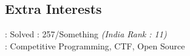 \documentclass[mm]{simple_style}
\begin{document}
\begin{resume}
\sectionline

\section{Extra Interests}
: Solved : 257/Something \textit{(India Rank : 11)}\\
: Competitive Programming, CTF, Open Source
\end{resume}
\end{document}

